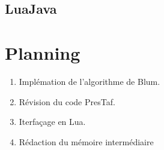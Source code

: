 \documentclass{article}%
\begin{document}

\subsection{LuaJava}

\section{Planning}


\begin{enumerate}
\item Implémation de l'algorithme de Blum.
\item Révision du code PresTaf.
\item Iterfaçage en Lua.
\item Rédaction du mémoire intermédiaire
\end{enumerate}


\appendix

{}


\printglossaries

\end{document}
